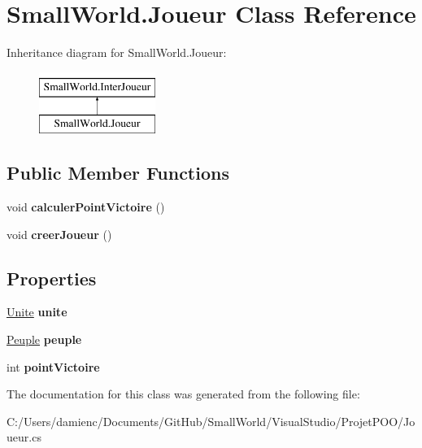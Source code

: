 \hypertarget{class_small_world_1_1_joueur}{\section{Small\-World.\-Joueur Class Reference}
\label{class_small_world_1_1_joueur}
}
Inheritance diagram for Small\-World.\-Joueur\-:\begin{figure}[H]
\begin{center}
\leavevmode
\includegraphics[height=2.000000cm]{class_small_world_1_1_joueur}
\end{center}
\end{figure}
\subsection*{Public Member Functions}
\begin{DoxyCompactItemize}
\item 
\hypertarget{class_small_world_1_1_joueur_a7e0f92b4b3a20dd86dabb9a2c986dcc0}{void {\bfseries calculer\-Point\-Victoire} ()}\label{class_small_world_1_1_joueur_a7e0f92b4b3a20dd86dabb9a2c986dcc0}

\item 
\hypertarget{class_small_world_1_1_joueur_a9fa34909f3b3614fe95a6e9e658f326d}{void {\bfseries creer\-Joueur} ()}\label{class_small_world_1_1_joueur_a9fa34909f3b3614fe95a6e9e658f326d}

\end{DoxyCompactItemize}
\subsection*{Properties}
\begin{DoxyCompactItemize}
\item 
\hypertarget{class_small_world_1_1_joueur_aa067290a5f303e61a281cef9be45616e}{\hyperlink{class_small_world_1_1_unite}{Unite} {\bfseries unite}}\label{class_small_world_1_1_joueur_aa067290a5f303e61a281cef9be45616e}

\item 
\hypertarget{class_small_world_1_1_joueur_aaedc71c4e752242d027683df8f7d4ec1}{\hyperlink{class_small_world_1_1_peuple}{Peuple} {\bfseries peuple}}\label{class_small_world_1_1_joueur_aaedc71c4e752242d027683df8f7d4ec1}

\item 
\hypertarget{class_small_world_1_1_joueur_a90b37fe50d88159251b64d456c8998f0}{int {\bfseries point\-Victoire}}\label{class_small_world_1_1_joueur_a90b37fe50d88159251b64d456c8998f0}

\end{DoxyCompactItemize}


The documentation for this class was generated from the following file\-:\begin{DoxyCompactItemize}
\item 
C\-:/\-Users/damienc/\-Documents/\-Git\-Hub/\-Small\-World/\-Visual\-Studio/\-Projet\-P\-O\-O/Joueur.\-cs\end{DoxyCompactItemize}
